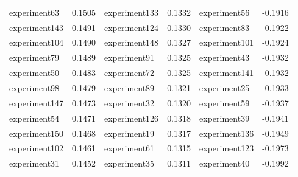 \begin{table}[ht]
{\begin{tabular}{lr@{\hspace{1cm}}lr@{\hspace{1cm}}lr}
            experiment63                          & 0.1505                    & experiment133                    & 0.1332                     & experiment56                    & -0.1916                    \\
            experiment143                         & 0.1491                    & experiment124                    & 0.1330                     & experiment83                    & -0.1922                    \\
            experiment104                         & 0.1490                    & experiment148                    & 0.1327                     & experiment101                   & -0.1924                    \\
            experiment79                          & 0.1489                    & experiment91                     & 0.1325                     & experiment43                    & -0.1932                    \\
            experiment50                          & 0.1483                    & experiment72                     & 0.1325                     & experiment141                   & -0.1932                    \\
            experiment98                          & 0.1479                    & experiment89                     & 0.1321                     & experiment25                    & -0.1933                    \\
            experiment147                         & 0.1473                    & experiment32                     & 0.1320                     & experiment59                    & -0.1937                    \\
            experiment54                          & 0.1471                    & experiment126                    & 0.1318                     & experiment39                    & -0.1941                    \\
            experiment150                         & 0.1468                    & experiment19                     & 0.1317                     & experiment136                   & -0.1949                    \\
            experiment102                         & 0.1461                    & experiment61                     & 0.1315                     & experiment123                   & -0.1973                    \\
            experiment31                          & 0.1452                    & experiment35                     & 0.1311                     & experiment40                    & -0.1992                    \\

\end{tabular}}
\end{table}
